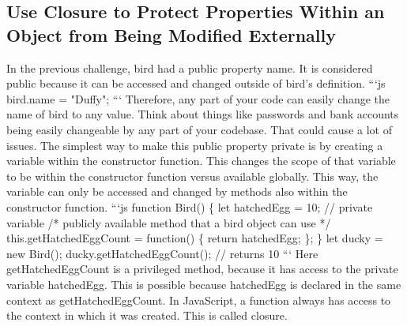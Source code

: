\documentclass{article}%
\begin{document}
%
\subsection{Use Closure to Protect Properties Within an Object from Being Modified Externally}%
\label{subsec:UseClosuretoProtectPropertiesWithinanObjectfromBeingModifiedExternally}%
In the previous challenge, bird had a public property name. It is considered public because it can be accessed and changed outside of bird's definition.\newline%
```js\newline%
bird.name = "Duffy";\newline%
```\newline%
Therefore, any part of your code can easily change the name of bird to any value. Think about things like passwords and bank accounts being easily changeable by any part of your codebase. That could cause a lot of issues.\newline%
The simplest way to make this public property private is by creating a variable within the constructor function. This changes the scope of that variable to be within the constructor function versus available globally. This way, the variable can only be accessed and changed by methods also within the constructor function.\newline%
```js\newline%
function Bird() \{\newline%
  let hatchedEgg = 10; // private variable\newline%
  /* publicly available method that a bird object can use */\newline%
  this.getHatchedEggCount = function() \{ \newline%
    return hatchedEgg;\newline%
  \};\newline%
\}\newline%
let ducky = new Bird();\newline%
ducky.getHatchedEggCount(); // returns 10\newline%
```\newline%
Here getHatchedEggCount is a privileged method, because it has access to the private variable hatchedEgg. This is possible because hatchedEgg is declared in the same context as getHatchedEggCount. In JavaScript, a function always has access to the context in which it was created. This is called closure.\newline%

%
\end{document}

